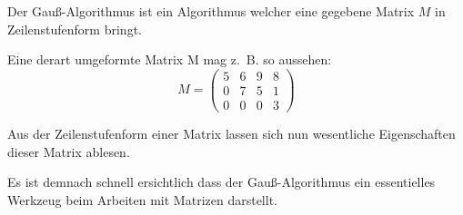 Der Gauß-Algorithmus ist ein Algorithmus welcher eine gegebene Matrix $M$ in Zeilenstufenform bringt.

Eine derart umgeformte Matrix M mag z.~B. so aussehen:
\[ M = \begin{pmatrix}
5 & 6 & 9 & 8\\ 
0 & 7 & 5 & 1\\ 
0 & 0 & 0 & 3
\end{pmatrix} \]

Aus der Zeilenstufenform einer Matrix lassen sich nun wesentliche Eigenschaften dieser Matrix ablesen.

Es ist demnach schnell ersichtlich dass der Gauß-Algorithmus ein essentielles Werkzeug beim Arbeiten mit Matrizen darstellt.
